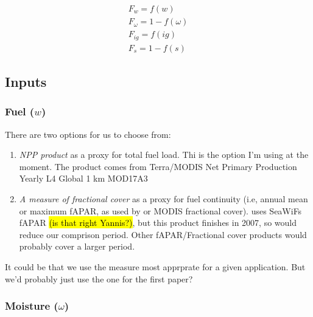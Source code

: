 \begin{equation}
    \begin{split}
        F_{w} = f(w) \\
        F_{\omega} = 1 - f(\omega) \\
        F_{ig} = f(ig) \\
        F_{s} = 1- f(s)
    \end{split}
    \label{equ:LimFIRE.x}
\end{equation}



\subsection{Inputs}
\begin{shaded}
\subsubsection{Fuel ($w$)}
There are two options for us to choose from:
\begin{enumerate}
    \item \textit{NPP product} as a proxy for total fuel load. Thi is the option I'm using at the moment. The product comes from Terra/MODIS Net Primary Production Yearly L4 Global 1 km MOD17A3 \citep{nasa2012terra}
    \item \textit{A measure of fractional cover} as a proxy for fuel continuity (i.e, annual mean or maximum fAPAR, as used by \citet{knorr2014impact,knorr2016climate} or MODIS fractional cover). \citet{bistinas2014causal} uses SeaWiFs fAPAR \hl{(is that right Yannis?)}, but this product finishes in 2007, so would reduce our comprison period. Other fAPAR/Fractional cover products would probably cover a larger period.
\end{enumerate}

It could be that we use the measure most apprprate for a given application. But we'd probably just use the one for the first paper?
\end{shaded}

\subsubsection{Moisture ($\omega$)}

